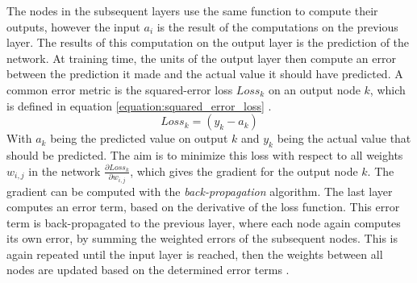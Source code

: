 The nodes in the subsequent layers use the same function to compute their outputs, however the input $a_i$ is the result of the computations on the previous layer.
The results of this computation on the output layer is the prediction of the network.
At training time, the units of the output layer then compute an error between the prediction it made and the actual value it should have predicted.
A common error metric is the squared-error loss $Loss_k$ on an output node $k$, which is defined in equation \ref{equation:squared_error_loss} \cite[p. 735]{Russel2016}.
\begin{equation}
    Loss_k=(y_k - a_k)
    \label{equation:squared_error_loss}
\end{equation}
With $a_k$ being the predicted value on output $k$ and $y_k$ being the actual value that should be predicted.
The aim is to minimize this loss with respect to all weights $w_{i,j}$ in the network $\frac{\partial Loss_k}{\partial w_{i,j}}$, which gives the gradient for the output node $k$.
The gradient can be computed with the \textit{back-propagation} algorithm.
The last layer computes an error term, based on the derivative of the loss function.
This error term is back-propagated to the previous layer, where each node again computes its own error, by summing the weighted errors of the subsequent nodes.
This is again repeated until the input layer is reached, then the weights between all nodes are updated based on the determined error terms \cite[p. 734]{Russel2016}.

